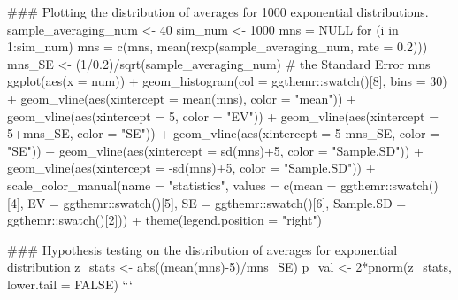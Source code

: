 ### Plotting the distribution of averages for 1000 exponential distributions.
sample_averaging_num  <- 40
sim_num <- 1000
mns = NULL
for (i in 1:sim_num) mns = c(mns, mean(rexp(sample_averaging_num, rate = 0.2)))
mns_SE <- (1/0.2)/sqrt(sample_averaging_num) # the Standard Error
mns %
ggplot(aes(x = num)) +
    geom_histogram(col = ggthemr::swatch()[8], bins = 30) +
    geom_vline(aes(xintercept = mean(mns), color = "mean")) +
    geom_vline(aes(xintercept = 5, color = "EV")) +
    geom_vline(aes(xintercept = 5+mns_SE, color = "SE")) +
    geom_vline(aes(xintercept = 5-mns_SE, color = "SE")) +
    geom_vline(aes(xintercept = sd(mns)+5, color = "Sample.SD")) +
    geom_vline(aes(xintercept = -sd(mns)+5, color = "Sample.SD")) +
    scale_color_manual(name = "statistics", values = c(mean = ggthemr::swatch()[4],
                                                       EV = ggthemr::swatch()[5],
                                                       SE = ggthemr::swatch()[6],
                                                       Sample.SD = ggthemr::swatch()[2])) +
    theme(legend.position = "right")

### Hypothesis testing on the distribution of averages for exponential distribution
z_stats <- abs((mean(mns)-5)/mns_SE)
p_val <- 2*pnorm(z_stats, lower.tail = FALSE)
```
